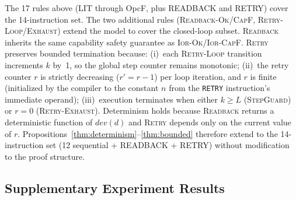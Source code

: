 \documentclass[a4paper,fleqn,longmktitle]{cas-dc}
\begin{document}
\begin{rmk}
The 17 rules above (LIT through OpcF, plus READBACK and RETRY) cover the 14-instruction set. The two additional rules (\textsc{Readback-Ok/CapF}, \textsc{Retry-Loop/Exhaust}) extend the model to cover the closed-loop subset. \textsc{Readback} inherits the same capability safety guarantee as \textsc{Ior-Ok/Ior-CapF}. \textsc{Retry} preserves bounded termination because: (i)~each \textsc{Retry-Loop} transition increments $k$ by~1, so the global step counter remains monotonic; (ii)~the retry counter $r$ is strictly decreasing ($r' = r - 1$) per loop iteration, and $r$ is finite (initialized by the compiler to the constant $n$ from the \texttt{RETRY} instruction's immediate operand); (iii)~execution terminates when either $k \geq L$ (\textsc{StepGuard}) or $r = 0$ (\textsc{Retry-Exhaust}). Determinism holds because \textsc{Readback} returns a deterministic function of $\mathit{dev}(d)$ and \textsc{Retry} depends only on the current value of $r$. Propositions~\ref{thm:determinism}--\ref{thm:bounded} therefore extend to the 14-instruction set (12 sequential + READBACK + RETRY) without modification to the proof structure.
\end{rmk}

\subsection{Supplementary Experiment Results}
\label{app:c}

\begin{table}[t]
\centering
\caption{Extended task-set generation results (temperature,=,0.0): control-flow set (tasks\_v4, $n$=15) and extended closed-loop set (tasks\_v3\_expanded, $n$=96).}
\label{tab:app_control_flow}
\label{tab:app_closed_loop}
\footnotesize
{}
\end{table}
\end{document}
